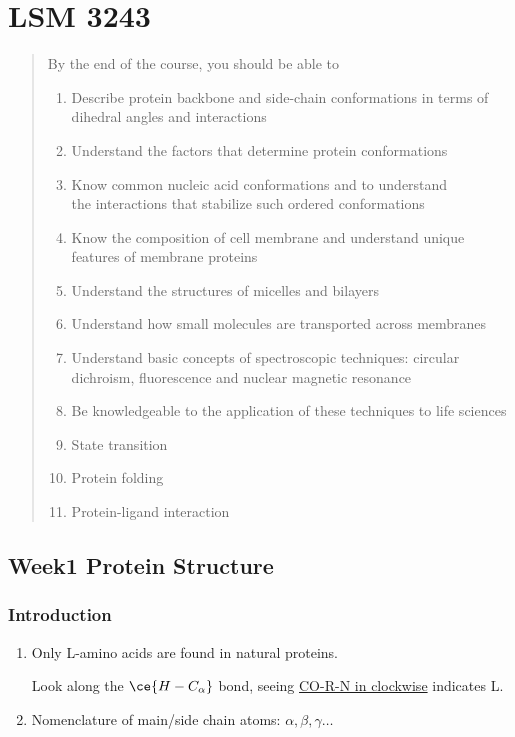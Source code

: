 \documentclass[]{article}
\date{}
\begin{document}
\hypertarget{lsm-3243}{%
\section{LSM 3243}\label{lsm-3243}}

\begin{quote}
By the end of the course, you should be able to

\begin{enumerate}
\def\labelenumi{\arabic{enumi}.}
\item
  Describe protein backbone and side-chain conformations in terms of
  dihedral angles and interactions
\item
  Understand the factors that determine protein conformations
\item
  Know common nucleic acid conformations and to understand\\
  the interactions that stabilize such ordered conformations
\item
  Know the composition of cell membrane and understand unique features
  of membrane proteins
\item
  Understand the structures of micelles and bilayers
\item
  Understand how small molecules are transported across membranes
\item
  Understand basic concepts of spectroscopic techniques: circular
  dichroism, fluorescence and nuclear magnetic resonance
\item
  Be knowledgeable to the application of these techniques to life
  sciences
\item
  State transition
\item
  Protein folding
\item
  Protein-ligand interaction
\end{enumerate}
\end{quote}

\hypertarget{week1-protein-structure}{%
\subsection{Week1 Protein Structure}\label{week1-protein-structure}}

\hypertarget{introduction}{%
\subsubsection{Introduction}\label{introduction}}

\begin{enumerate}
\def\labelenumi{\arabic{enumi}.}
\item
  Only L-amino acids are found in natural proteins.

  Look along the \(\ce{H-C_\alpha}\) bond, seeing \underline{CO-R-N in
  clockwise} indicates L.
\item
  Nomenclature of main/side chain atoms: \(\alpha, \beta, \gamma\dots\)
\end{enumerate}
\end{document}
